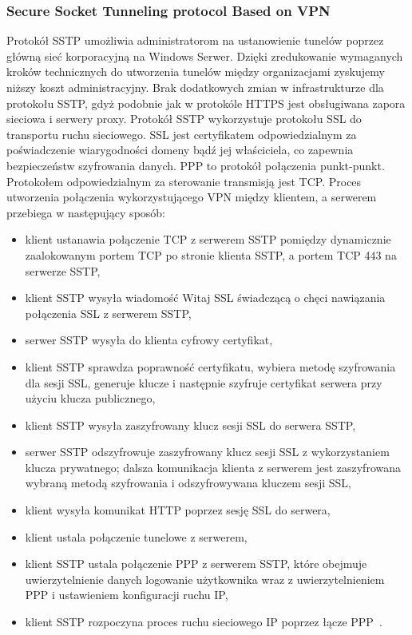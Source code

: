 \documentclass[12p]{article}
\begin{document}
\subsubsection{Secure Socket Tunneling protocol Based on VPN}
\quad Protokół SSTP umożliwia administratorom na ustanowienie tunelów poprzez główną sieć korporacyjną na Windows Serwer. Dzięki zredukowanie wymaganych kroków technicznych do utworzenia tunelów między organizacjami zyskujemy niższy koszt administracyjny. Brak dodatkowych zmian w infrastrukturze dla protokołu SSTP, gdyż podobnie jak w protokóle HTTPS jest obsługiwana zapora sieciowa i serwery proxy. Protokół SSTP wykorzystuje protokołu SSL do transportu ruchu sieciowego. SSL jest certyfikatem odpowiedzialnym za poświadczenie wiarygodności domeny bądź jej właściciela, co zapewnia bezpieczeństw szyfrowania danych. PPP to protokół połączenia punkt-punkt. Protokołem odpowiedzialnym za sterowanie transmisją jest TCP. 
Proces utworzenia połączenia wykorzystującego VPN między klientem, a serwerem przebiega w następujący sposób:
\begin{itemize}
\item klient ustanawia połączenie TCP z serwerem SSTP pomiędzy dynamicznie zaalokowanym portem TCP po stronie klienta SSTP, a portem TCP 443 na serwerze SSTP,
\item klient SSTP wysyła wiadomość Witaj SSL świadczącą o chęci nawiązania połączenia SSL z serwerem SSTP,
\item serwer SSTP wysyła do klienta cyfrowy certyfikat,
\item klient SSTP sprawdza poprawność certyfikatu, wybiera metodę szyfrowania dla sesji SSL, generuje klucze i następnie szyfruje certyfikat serwera przy użyciu klucza publicznego,
\item klient SSTP wysyła zaszyfrowany klucz sesji SSL do serwera SSTP,
\item serwer SSTP odszyfrowuje zaszyfrowany klucz sesji SSL z wykorzystaniem klucza prywatnego; dalsza komunikacja klienta z serwerem jest zaszyfrowana wybraną metodą szyfrowania i odszyfrowywana kluczem sesji SSL,
\item klient wysyła komunikat HTTP poprzez sesję SSL do serwera,
\item klient ustala połączenie tunelowe z serwerem,
\item klient SSTP ustala połączenie PPP z serwerem SSTP, które obejmuje uwierzytelnienie danych logowanie użytkownika wraz z uwierzytelnieniem PPP i ustawieniem konfiguracji ruchu IP,
\item klient SSTP rozpoczyna proces ruchu sieciowego IP poprzez łącze PPP~\cite{SSTP}.
\end{itemize}
\end{document}
